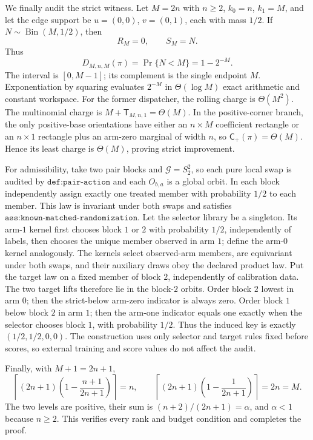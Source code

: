 We finally audit the strict witness. Let \(M=2n\) with \(n\ge2\), \(k_0=n\), \(k_1=M\), and let the edge support be \(u=(0,0)\), \(v=(0,1)\), each with mass \(1/2\). If \(N\sim\operatorname{Bin}(M,1/2)\), then
\[
R_M=0,\qquad S_M=N.
\tag{6}
\]
Thus
\[
D_{M,n,M}(\pi)=\Pr\{N<M\}=1-2^{-M}.
\tag{7}
\]
The interval is \([0,M-1]\); its complement is the single endpoint \(M\). Exponentiation by squaring evaluates \(2^{-M}\) in \(\Theta(\log M)\) exact arithmetic and constant workspace. For the former dispatcher, the rolling charge is \(\Theta(M^2)\). The multinomial charge is \(M+\mathsf T_{M,n,1}=\Theta(M)\). In the positive-corner branch, the only positive-base orientations have either an \(n\times M\) coefficient rectangle or an \(n\times1\) rectangle plus an arm-zero marginal of width \(n\), so \(\mathsf C_+(\pi)=\Theta(M)\). Hence its least charge is \(\Theta(M)\), proving strict improvement.

For admissibility, take two pair blocks and \(\mathcal G=S_2^2\), so each pure local swap is audited by \(\texttt{def:pair-action}\) and each \(O_{b,a}\) is a global orbit. In each block independently assign exactly one treated member with probability \(1/2\) to each member. This law is invariant under both swaps and satisfies \(\texttt{ass:known-matched-randomization}\). Let the selector library be a singleton. Its arm-\(1\) kernel first chooses block \(1\) or \(2\) with probability \(1/2\), independently of labels, then chooses the unique member observed in arm \(1\); define the arm-\(0\) kernel analogously. The kernels select observed-arm members, are equivariant under both swaps, and their auxiliary draws obey the declared product law. Put the target law on a fixed member of block \(2\), independently of calibration data. The two target lifts therefore lie in the block-\(2\) orbits. Order block \(2\) lowest in arm \(0\); then the strict-below arm-zero indicator is always zero. Order block \(1\) below block \(2\) in arm \(1\); then the arm-one indicator equals one exactly when the selector chooses block \(1\), with probability \(1/2\). Thus the induced key is exactly \((1/2,1/2,0,0)\). The construction uses only selector and target rules fixed before scores, so external training and score values do not affect the audit.

Finally, with \(M+1=2n+1\),
\[
\left\lceil(2n+1)\left(1-\frac{n+1}{2n+1}\right)\right\rceil=n,
\qquad
\left\lceil(2n+1)\left(1-\frac1{2n+1}\right)\right\rceil=2n=M.
\tag{8}
\]
The two levels are positive, their sum is \((n+2)/(2n+1)=\alpha\), and \(\alpha<1\) because \(n\ge2\). This verifies every rank and budget condition and completes the proof.